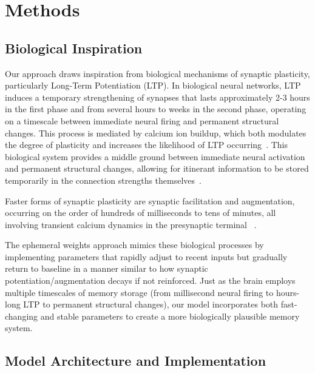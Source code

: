 \section{Methods}

\subsection{Biological Inspiration}

Our approach draws inspiration from biological mechanisms of synaptic plasticity, particularly Long-Term Potentiation (LTP). In biological neural networks, LTP induces a temporary strengthening of synapses that lasts approximately 2-3 hours in the first phase and from several hours to weeks in the second phase, operating on a timescale between immediate neural firing and permanent structural changes. This process is mediated by calcium ion buildup, which both modulates the degree of plasticity and increases the likelihood of LTP occurring~\cite{lynchLongtermPotentiationMemory2004}. This biological system provides a middle ground between immediate neural activation and permanent structural changes, allowing for itinerant information to be stored temporarily in the connection strengths themselves~\cite{martinSynapticPlasticityMemory2000}.

Faster forms of synaptic plasticity are synaptic facilitation and augmentation, occurring on the order of hundreds of milliseconds to tens of minutes, all involving transient calcium dynamics in the presynaptic terminal ~\cite{regehrShortTermPresynapticPlasticity2012}.

The ephemeral weights approach mimics these biological processes by implementing parameters that rapidly adjust to recent inputs but gradually return to baseline in a manner similar to how synaptic potentiation/augmentation decays if not reinforced. Just as the brain employs multiple timescales of memory storage (from millisecond neural firing to hours-long LTP to permanent structural changes), our model incorporates both fast-changing and stable parameters to create a more biologically plausible memory system.

\subsection{Model Architecture and Implementation}

